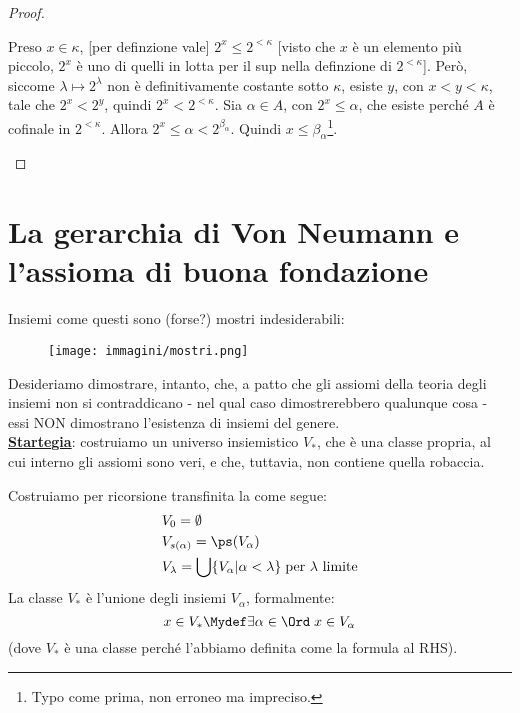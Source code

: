 \documentclass[11pt]{scrartcl}
\begin{document}
\begin{proof}
\begin{itemize}
\begin{itemize}
			Preso $x \in \kappa$, [per definzione vale] $2^{x} \leq 2^{<\kappa}$ [visto che $x$ è un elemento più piccolo, $2^x$ è uno di quelli in lotta per il sup nella definzione di $2^{<\kappa}$]. Però, siccome $\lambda \mapsto 2^\lambda$ non è definitivamente costante sotto $\kappa$, esiste $y$, con $x < y < \kappa$, tale che $2^x < 2^y$,
			quindi $2^{x} < 2^{<\kappa}$. Sia $\alpha \in A$, con $2^x \leq \alpha$, che esiste perché $A$ è cofinale in $2^{<\kappa}$. Allora $2^x \leq \alpha < 2^{\beta_\alpha}$. Quindi $x \leq \beta_\alpha$\footnote{Typo come prima, non erroneo ma impreciso.}.
		\end{itemize}
	\end{itemize}
\end{proof}


\pagebreak
\section{La gerarchia di Von Neumann e l'assioma di buona fondazione}
Insiemi come questi sono (forse?) mostri indesiderabili:

\begin{figure}[H]
	\centering\texttt{[image: immagini/mostri.png]}
\end{figure}

Desideriamo dimostrare, intanto, che, a patto che gli assiomi della teoria degli insiemi non si contraddicano - nel qual caso dimostrerebbero qualunque cosa - essi NON dimostrano l'esistenza di insiemi del genere.\\
\textbf{\underline{Startegia}}: costruiamo un universo insiemistico $V_*$, che è una classe propria, al cui interno gli assiomi sono veri, e che, tuttavia, non contiene quella robaccia.

\begin{definition}
	Costruiamo per ricorsione transfinita la  come segue:
	\begin{align*}
		&V_0 = \emptyset \\
		&V_{s(\alpha)} = \ps(V_\alpha) \\
		&V_\lambda = \bigcup\{V_\alpha | \alpha < \lambda\} \; \text{per $\lambda$ limite}
	\end{align*}
	La classe $V_*$ è l'unione degli insiemi $V_\alpha$, formalmente:
	\[ x \in V_* \Mydef \exists \alpha \in \Ord \; x \in V_\alpha
		\]
	(dove $V_*$ è una classe perché l'abbiamo definita come la formula al RHS).
\end{definition}
\end{document}
